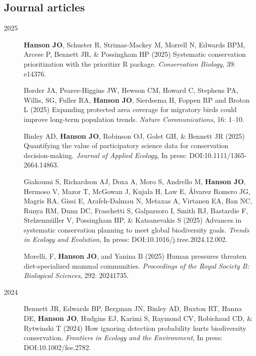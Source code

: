 \documentclass[12pt,a4paper]{article}
\begin{document}
\subsection*{Journal articles}
\begin{description}

\item[2025] \textbf{Hanson JO}, Schuster R, Strimas‐Mackey M, Morrell N, Edwards BPM, Arcese P, Bennett JR, \& Possingham HP (2025) Systematic conservation prioritization with the prioritizr R package. \textit{Conservation Biology}, 39: e14376.

\item[] Border JA, Pearce-Higgins JW, Hewson CM, Howard C, Stephens PA, Willis, SG, Fuller RA, \textbf{Hanson JO}, Sierdsema H, Foppen RP and Broton L (2025) Expanding protected area coverage for migratory birds could improve long-term population trends. \textit{Nature Communications}, 16: 1--10.

\item[] Binley AD, \textbf{Hanson JO}, Robinson OJ, Golet GH, \& Bennett JR (2025) Quantifying the value of participatory science data for conservation decision-making. \textit{Journal of Applied Ecology}, In press: DOI:10.1111/1365-2664.14863.

\item[] Giakoumi S, Richardson AJ, Doxa A, Moro S, Andrello M, \textbf{Hanson JO}, Hermoso V, Mazor T, McGowan J, Kujala H, Law E, Álvarez Romero JG, Magris RA, Gissi E, Arafeh-Dalmau N, Metaxas A, Virtanen EA, Ban NC, Runya RM, Dunn DC, Fraschetti S, Galparsoro I, Smith RJ, Bastardie F, Stelzenmüller V, Possingham HP, \& Katsanevakis S (2025) Advances in systematic conservation planning to meet global biodiversity goals. \textit{Trends in Ecology and Evolution}, In press: DOI:10.1016/j.tree.2024.12.002.

\item[] Morelli, F, \textbf{Hanson JO}, and Yanina B (2025) Human pressures threaten diet-specialized mammal communities. \textit{Proceedings of the Royal Society B: Biological Sciences}, 292: 20241735.

\item[2024] Bennett JR, Edwards BP, Bergman JN, Binley AD, Buxton RT, Hanna DE, \textbf{Hanson JO}, Hudgins EJ, Karimi S, Raymond CV, Robichaud CD, \& Rytwinski T (2024) How ignoring detection probability hurts biodiversity conservation. \textit{Frontiers in Ecology and the Environment}, In press: DOI:10.1002/fee.2782.


\end{description}
\end{document}
